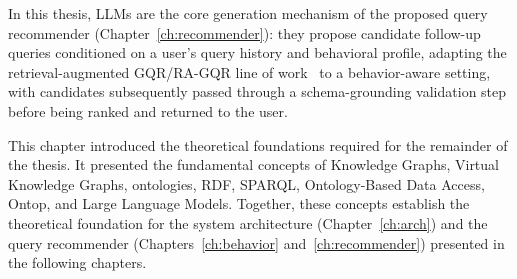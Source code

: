 In this thesis, LLMs are the core generation mechanism of the proposed query recommender (Chapter~\ref{ch:recommender}): they propose candidate follow-up queries conditioned on a user's query history and behavioral profile, adapting the retrieval-augmented GQR/RA-GQR line of work~\cite{bacciu2024} to a behavior-aware setting, with candidates subsequently passed through a schema-grounding validation step before being ranked and returned to the user.

This chapter introduced the theoretical foundations required for the remainder of the thesis. It presented the fundamental concepts of Knowledge Graphs, Virtual Knowledge Graphs, ontologies, RDF, SPARQL, Ontology-Based Data Access, Ontop, and Large Language Models. Together, these concepts establish the theoretical foundation for the system architecture (Chapter~\ref{ch:arch}) and the query recommender (Chapters~\ref{ch:behavior} and~\ref{ch:recommender}) presented in the following chapters.
